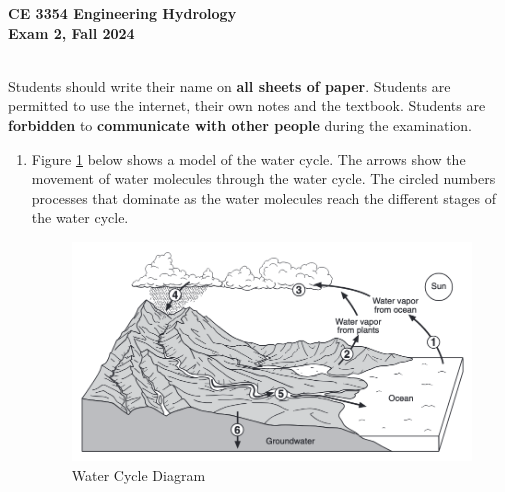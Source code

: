 \documentclass[12pt]{article}
\begin{document}
\begingroup
\begin{centering}
\textbf{CE 3354 Engineering Hydrology} \\
\textbf{Exam 2, Fall 2024}\\
\end{centering}
~\\
Students should write their name on \textbf{all sheets of paper}.  \newline 
Students are permitted to use the internet, their own notes and the textbook.  \newline 
Students are \textbf{forbidden} to \textbf{communicate with other people} during the examination.
\endgroup
\begin{enumerate}
\item Figure \ref{fig:watercycle} below shows a model of the water cycle. 
The arrows show the movement of water molecules through the water cycle. 
The circled numbers processes that dominate as the water molecules reach the different stages of the water cycle. \newline
\begin{figure}[h!] %
   \centering
   \includegraphics[width=5in]{watercycle.png} 
   \caption{Water Cycle Diagram}
   \label{fig:watercycle}
\end{figure}


\end{enumerate}
\end{document}
